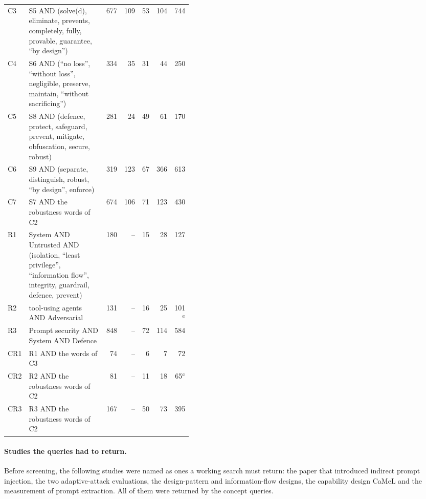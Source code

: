 \begin{table}[tbp]
\begin{sidecaption}
\begin{tabular}{@{}lp{0.42\linewidth}rrrrr@{}}
      C3 & S5 AND (solve(d), eliminate, prevents, completely, fully, provable, guarantee, \enquote{by design}) & 677 & 109 & 53 & 104 & 744 \\
      C4 & S6 AND (\enquote{no loss}, \enquote{without loss}, negligible, preserve, maintain, \enquote{without sacrificing}) & 334 & 35 & 31 & 44 & 250 \\
      C5 & S8 AND (defence, protect, safeguard, prevent, mitigate, obfuscation, secure, robust) & 281 & 24 & 49 & 61 & 170 \\
      C6 & S9 AND (separate, distinguish, robust, \enquote{by design}, enforce) & 319 & 123 & 67 & 366 & 613 \\
      C7 & S7 AND the robustness words of C2 & 674 & 106 & 71 & 123 & 430 \\
      R1 & System AND Untrusted AND (isolation, \enquote{least privilege}, \enquote{information flow}, integrity, guardrail, defence, prevent) & 180 & -- & 15 & 28 & 127 \\
      R2 & tool-using agents AND Adversarial & 131 & -- & 16 & 25 & 101$^{a}$ \\
      R3 & Prompt security AND System AND Defence & 848 & -- & 72 & 114 & 584 \\
      CR1 & R1 AND the words of C3 & 74 & -- & 6 & 7 & 72 \\
      CR2 & R2 AND the robustness words of C2 & 81 & -- & 11 & 18 & 65$^{a}$ \\
      CR3 & R3 AND the robustness words of C2 & 167 & -- & 50 & 73 & 395 \\
      \bottomrule
    \end{tabular}
  \end{sidecaption}
\end{table}

\paragraph{Studies the queries had to return.}
Before screening, the following studies were named as ones a working
search must return: the paper that introduced indirect prompt
injection\autocite{Greshake2023Signed}, the two adaptive-attack
evaluations\autocite{Zhan2025Adaptive,Nasr2026AttackerSecond}, the
design-pattern and information-flow
designs\autocite{BeurerKellner2025Patterns,Wu2024IFC}, the capability
design CaMeL\autocite{Debenedetti2026CaMeL} and the measurement of
prompt extraction\autocite{Zhang2024Extraction}. All of them were
returned by the concept queries.

